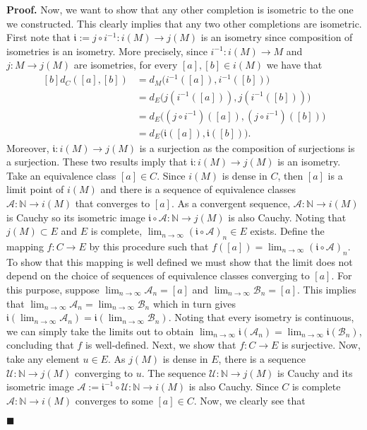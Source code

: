 \documentclass[10pt]{article}
\theoremstyle{definition}
\theoremstyle{remark}
\newenvironment{prf}{\noindent\textbf{Proof.}}{\hfill$\blacksquare$}
\begin{document}
\begin{prf}
Now, we want to show that any other completion is isometric to the one we constructed. This clearly implies that any two other completions are isometric. First note that $\mathfrak{i}:=j\circ i^{-1}:i(M)\to j(M)$ is an isometry since composition of isometries is an isometry. More precisely, since $i^{-1}:i(M)\to M$ and $j:M\to j(M)$ are isometries, for every $[a],[b]\in i(M)$ we have that
\begin{equation}
\begin{aligned}[b]
d_C([a],[b]) &= d_M\big(i^{-1}([a]),i^{-1}([b])\big) \\
&= d_E\big(j(i^{-1}([a])),j(i^{-1}([b]))\big) \\
&= d_E\big((j\circ i^{-1})([a]),(j\circ i^{-1})([b])\big) \\
&= d_E\big(\mathfrak{i}([a]),\mathfrak{i}([b])\big).
\end{aligned}
\end{equation}
Moreover, $\mathfrak{i}:i(M)\to j(M)$ is a surjection as the composition of surjections is a surjection. These two results imply that $\mathfrak{i}:i(M)\to j(M)$ is an isometry. Take an equivalence class $[a]\in C$. Since $i(M)$ is dense in $C$, then $[a]$ is a limit point of $i(M)$ and there is a sequence of equivalence classes $\mathcal{A}:\mathbb{N}\to i(M)$ that converges to $[a]$. As a convergent sequence, $\mathcal{A}:\mathbb{N}\to i(M)$ is Cauchy so its isometric image $\mathfrak{i}\circ \mathcal{A}:\mathbb{N}\to j(M)$ is also Cauchy. Noting that $j(M)\subset E$ and $E$ is complete, $\lim_{n\to\infty}(\mathfrak{i}\circ\mathcal{A})_n\in E$ exists. Define the mapping $f:C\to E$ by this procedure such that $f([a])=\lim_{n\to\infty}(\mathfrak{i}\circ\mathcal{A})_n$. To show that this mapping is well defined we must show that the limit does not depend on the choice of sequences of equivalence classes converging to $[a]$. For this purpose, suppose $\lim_{n\to\infty}\mathcal{A}_n=[a]$ and $\lim_{n\to\infty}\mathcal{B}_n=[a]$. This implies that $\lim_{n\to\infty}\mathcal{A}_n=\lim_{n\to\infty}\mathcal{B}_n$ which in turn gives $\mathfrak{i}(\lim_{n\to\infty}\mathcal{A}_n)=\mathfrak{i}(\lim_{n\to\infty}\mathcal{B}_n)$. Noting that every isometry is continuous, we can simply take the limits out to obtain $\lim_{n\to\infty}\mathfrak{i}(\mathcal{A}_n)=\lim_{n\to\infty}\mathfrak{i}(\mathcal{B}_n)$, concluding that $f$ is well-defined. Next, we show that $f:C\to E$ is surjective. Now, take any element $u\in E$. As $j(M)$ is dense in $E$, there is a sequence $\mathcal{U}:\mathbb{N}\to j(M)$ converging to $u$. The sequence $\mathcal{U}:\mathbb{N}\to j(M)$ is Cauchy and its isometric image $\mathcal{A}:=\mathfrak{i}^{-1}\circ\mathcal{U}:\mathbb{N}\to i(M)$ is also Cauchy. Since $C$ is complete $\mathcal{A}:\mathbb{N}\to i(M)$ converges to some $[a]\in C$. Now, we clearly see that

\end{prf}
\end{document}
